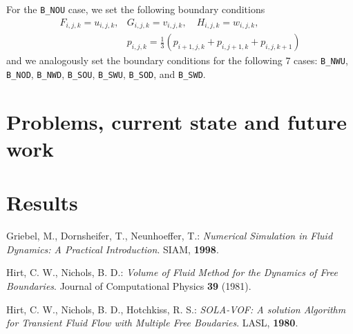 \documentclass[a4paper, 12pt]{article}
\begin{document}
For the \texttt{B\_NOU} case, we set the following boundary conditions
\begin{equation}
\begin{array}{ll}
F_{i,j,k} = u_{i,j,k}, & G_{i,j,k} = v_{i,j,k}, \quad H_{i,j,k} = w_{i,j,k}, \\
 & p_{i,j,k} = \frac{1}{3}(p_{i+1,j,k}+p_{i,j+1,k}+p_{i,j,k+1})
\end{array}
\end{equation}
and we analogously set the boundary conditions for the following 7 cases: \texttt{B\_NWU}, \texttt{B\_NOD}, \texttt{B\_NWD}, \texttt{B\_SOU}, \texttt{B\_SWU}, \texttt{B\_SOD}, and \texttt{B\_SWD}.

\section{Problems, current state and future work}

\section{Results}

\begin{thebibliography}{99}
Griebel, M., Dornsheifer, T., Neunhoeffer, T.: \emph{Numerical Simulation in
Fluid Dynamics: A Practical Introduction}. SIAM, {\bf 1998}.

Hirt, C. W., Nichols, B. D.: \emph{Volume of Fluid Method for the Dynamics of Free Boundaries}. Journal of Computational Physics {\bf 39} (1981).

Hirt, C. W., Nichols, B. D., Hotchkiss, R. S.: \emph{SOLA-VOF: A solution Algorithm for Transient Fluid Flow with Multiple Free Boudaries}. LASL, {\bf 1980}.
\end{thebibliography}
\end{document}

